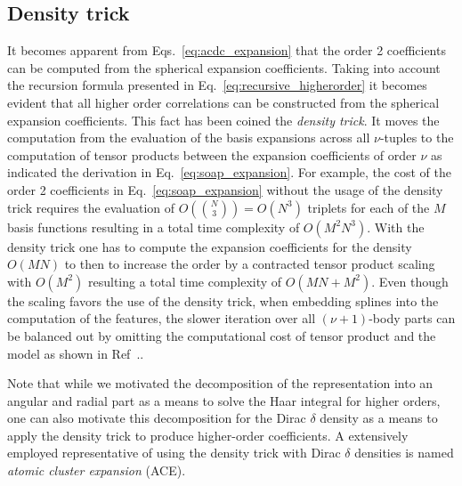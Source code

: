 \subsection{Density trick}
It becomes apparent from Eqs.~\eqref{eq:acdc_expansion} that the order 2 coefficients can be computed from the spherical expansion coefficients.
Taking into account the recursion formula presented in Eq.~\eqref{eq:recursive_higherorder} it becomes evident that all higher order correlations can be constructed from the spherical expansion coefficients.
This fact %
has been coined the \emph{density trick}.
It moves the computation from the evaluation of the basis expansions across all $\nu$-tuples to the computation of tensor products between the expansion coefficients of order $\nu$ as indicated the derivation in Eq.~\eqref{eq:soap_expansion}.
For example, the cost of the order 2 coefficients in Eq.~\eqref{eq:soap_expansion} without the usage of the density trick requires the evaluation of $O({N\choose 3}) = O(N^3)$ triplets for each of the $M$ basis functions resulting in a total time complexity of $O(M^2N^3)$.
With the density trick one has to compute the expansion coefficients for the density $O(MN)$ to then to increase the order by a contracted tensor product scaling with $O(M^2)$ resulting a total time complexity of $O(MN+M^2)$.
Even though the scaling favors the use of the density trick, when embedding splines into the computation of the features, the slower iteration over all $(\nu+1)$-body parts can be balanced out by omitting the computational cost of tensor product and the model as shown in Ref~.\cite{xie2023ultra}.

Note that while we motivated the decomposition of the representation into an angular and radial part as a means to solve the Haar integral for higher orders, one can also motivate this decomposition for the Dirac $\delta$ density as a means to apply the density trick to produce higher-order coefficients.
A extensively employed representative of using the density trick with Dirac $\delta$ densities is named \emph{atomic cluster expansion} (ACE)\cite{drautz2019atomic}.

